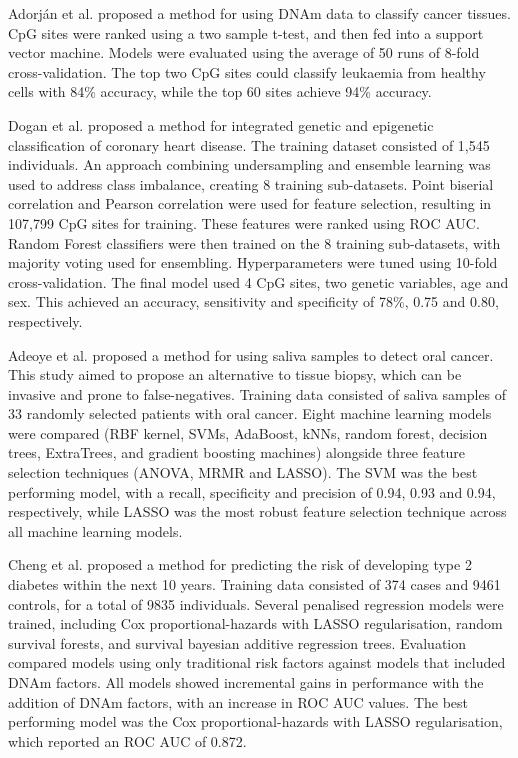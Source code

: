 \documentclass{article} %
\begin{document}
Adorj\'an et al. \cite{adorjan2002tumour} proposed a method for using DNAm data to classify cancer tissues. CpG sites were ranked using a two sample t-test, and then fed into a support vector machine. Models were evaluated using the average of 50 runs of 8-fold cross-validation. The top two CpG sites could classify leukaemia from healthy cells with 84\% accuracy, while the top 60 sites achieve 94\% accuracy.

Dogan et al. \cite{dogan2018integrated} proposed a method for integrated genetic and epigenetic classification of coronary heart disease. The training dataset consisted of 1,545 individuals. An approach combining undersampling and ensemble learning \cite{liu2008exploratory} was used to address class imbalance, creating 8 training sub-datasets. Point biserial correlation and Pearson correlation were used for feature selection, resulting in 107,799 CpG sites for training. These features were ranked using ROC AUC. Random Forest classifiers were then trained on the 8 training sub-datasets, with majority voting used for ensembling. Hyperparameters were tuned using 10-fold cross-validation. The final model used 4 CpG sites, two genetic variables, age and sex. This achieved an accuracy, sensitivity and specificity of 78\%, 0.75 and 0.80, respectively.

Adeoye et al. \cite{adeoye2022machine} proposed a method for using saliva samples to detect oral cancer. This study aimed to propose an alternative to tissue biopsy, which can be invasive and prone to false-negatives. Training data consisted of saliva samples of 33 randomly selected patients with oral cancer. Eight machine learning models were compared (RBF kernel, SVMs, AdaBoost, kNNs, random forest, decision trees, ExtraTrees, and gradient boosting machines) alongside three feature selection techniques (ANOVA, MRMR and LASSO). The SVM was the best performing model, with a recall, specificity and precision of 0.94, 0.93 and 0.94, respectively, while LASSO was the most robust feature selection technique across all machine learning models.

Cheng et al. \cite{cheng2023development} proposed a method for predicting the risk of developing type 2 diabetes within the next 10 years. Training data consisted of 374 cases and \num{9461} controls, for a total of \num{9835} individuals. Several penalised regression models were trained, including Cox proportional-hazards with LASSO regularisation, random survival forests, and survival bayesian additive regression trees. Evaluation compared models using only traditional risk factors against models that included DNAm factors. All models showed incremental gains in performance with the addition of DNAm factors, with an increase in ROC AUC values. The best performing model was the Cox proportional-hazards with LASSO regularisation, which reported an ROC AUC of 0.872.
\end{document}
